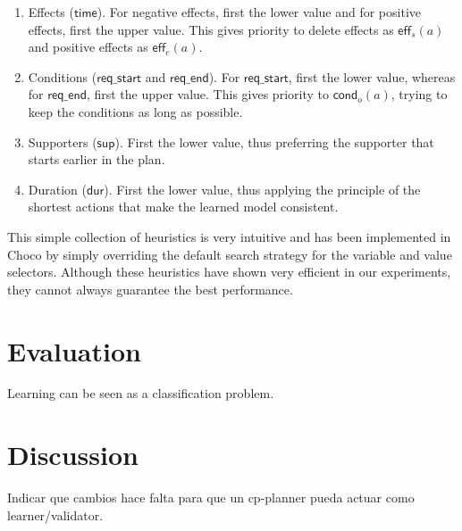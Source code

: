 \documentclass[runningheads]{llncs}
\newcommand{\eff}{\mathsf{eff}}    %
\newcommand{\cond}{\mathsf{cond}}  %
\newcommand{\dur}{\mathsf{dur}}    %
\newcommand{\supp}{\mathsf{sup}}   %
\newcommand{\tim}{\mathsf{time}}   %
\newcommand{\reqs}{\mathsf{req\_{start}}} %
\newcommand{\reqe}{\mathsf{req\_{end}}}   %
\begin{document}


\begin{enumerate}
  \item Effects ($\tim$). For negative effects, first the lower value and for positive effects, first the upper value. This gives priority to delete effects as $\eff_s(a)$ and positive effects as $\eff_e(a)$.
  \item Conditions ($\reqs$ and $\reqe$). For $\reqs$, first the lower value, whereas for $\reqe$, first the upper value. This gives priority to $\cond_o(a)$, trying to keep the conditions as long as possible.
  \item Supporters ($\supp$). First the lower value, thus preferring the supporter that starts earlier in the plan.
  \item Duration ($\dur$). First the lower value, thus applying the principle of the shortest actions that make the learned model consistent.
\end{enumerate}


This simple collection of heuristics is very intuitive and has been implemented in \textsf{Choco} by simply overriding the default search strategy for the variable and value selectors. Although these heuristics have shown very efficient in our experiments, they cannot always guarantee the best performance.



\section{Evaluation}
\label{sec:evaluation}

Learning can be seen as a classification problem.


\section{Discussion}
\label{sec:discussion}

Indicar que cambios hace falta para que un cp-planner pueda actuar como learner/validator.
\end{document}
